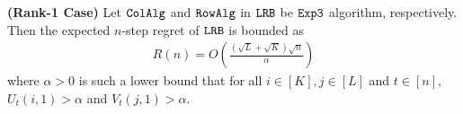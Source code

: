 
\begin{theorem} \textbf{(Rank-1 Case)}
\label{thm:upper bound} Let ${\tt ColAlg}$ and ${\tt RowAlg}$ in ${\tt LRB}$ be ${\tt Exp3}$ algorithm, respectively. Then the expected $n$-step regret of ${\tt LRB}$ is bounded as
\begin{align*}
  R(n) = O\left(\frac{\left(\sqrt{L } + \sqrt{K }\right)\sqrt{n}}{\alpha}\right)
\end{align*}
where $\alpha > 0$ is such a lower bound that for all $i\in[K], j\in [L]$ and $t \in [n]$, $U_{t}(i,1) > \alpha$ and $V_{t}(j,1) > \alpha$.


\end{theorem}
